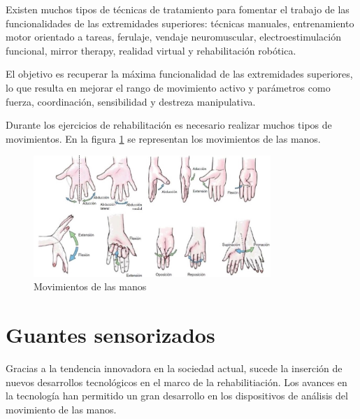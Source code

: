 Existen muchos tipos de técnicas de tratamiento para fomentar el trabajo de las funcionalidades de las extremidades superiores: técnicas manuales, entrenamiento motor orientado a tareas, ferulaje, vendaje neuromuscular, electroestimulación funcional, %
mirror therapy, %
realidad virtual y rehabilitación robótica.


El objetivo es recuperar la máxima funcionalidad de las extremidades superiores, lo que resulta en mejorar el rango de movimiento activo y parámetros como fuerza, coordinación, sensibilidad y destreza manipulativa.

Durante los ejercicios de rehabilitación es necesario realizar muchos tipos de movimientos. En la figura \ref{fig:movManos} se representan los movimientos de las manos. %

\begin{figure}[H]
	\centering
	\includegraphics[width=0.8\textwidth]{./img/ejerciciosRehManp2}
	\caption{Movimientos de las manos \cite{movimientoMano}} 
	\label{fig:movManos}
\end{figure}


\section{Guantes sensorizados}
\label{sec:captura2}

Gracias a la tendencia innovadora en la sociedad actual, sucede la inserción de nuevos desarrollos tecnológicos en el marco de la rehabilitiación. Los avances en la tecnología han permitido un gran desarrollo en los dispositivos de análisis del movimiento de las manos.

